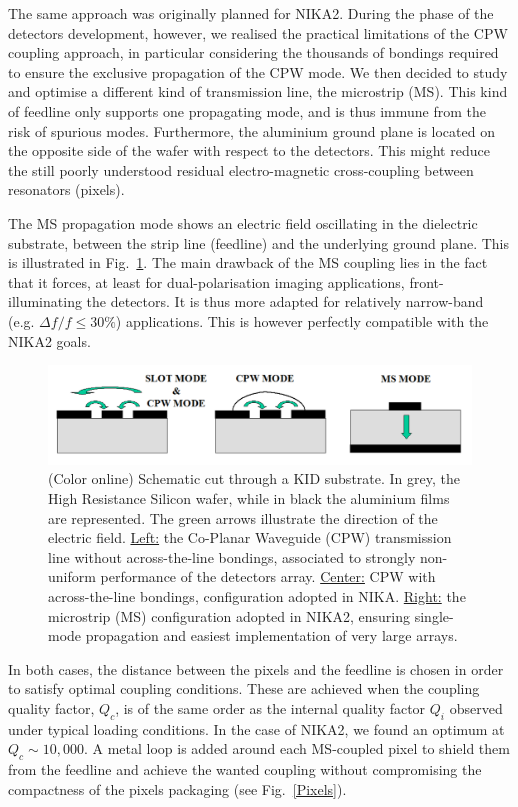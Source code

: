 \documentclass[]{aa} %
\begin{document}
The same approach was originally planned for NIKA2. During the phase of the detectors development, however, we realised the practical limitations of the CPW coupling approach, in particular considering the thousands of bondings required to ensure the exclusive propagation of the CPW mode. We then decided to study and optimise a different kind of transmission line, the microstrip (MS). This kind of feedline only supports one propagating mode, and is thus immune from the risk of spurious modes. Furthermore, the aluminium ground plane is located on the opposite side of the wafer with respect to the detectors. This might reduce the still poorly understood residual electro-magnetic cross-coupling between resonators (pixels).

The MS propagation mode shows an electric field oscillating in the dielectric substrate, between the strip line (feedline) and the underlying ground plane. This is illustrated in Fig.~\ref{CPWvsMS}. The main drawback of the MS coupling lies in the fact that it forces, at least for dual-polarisation imaging applications, front-illuminating the detectors. It is thus more adapted for relatively narrow-band (e.g. $\Delta f / f  \leq 30 \%$) applications. This is however perfectly compatible with the NIKA2 goals.  

\begin{figure}[h]
   \centering
    \includegraphics[width=.95\linewidth]{CPWvsMS.png}
      \caption{(Color online) Schematic cut through a KID substrate. In grey, the High Resistance Silicon wafer, while in black the aluminium films are represented. The green arrows illustrate the direction of the electric field. \underline{Left:} the Co-Planar Waveguide (CPW) transmission line without across-the-line bondings, associated to strongly non-uniform performance of the detectors array. \underline{Center:} CPW with across-the-line bondings, configuration adopted in NIKA. \underline{Right:} the microstrip (MS) configuration adopted in NIKA2, ensuring single-mode propagation and easiest implementation of very large arrays.}
         \label{CPWvsMS}
\end{figure}

In both cases, the distance between the pixels and the feedline is chosen in order to satisfy optimal coupling conditions. These are achieved when the coupling quality factor, $Q_c$, is of the same order as the internal quality factor $Q_i$ observed under typical loading conditions. In the case of NIKA2, we found an optimum at $Q_c\sim10,000$. A metal loop is added around each MS-coupled pixel to shield them from the feedline and achieve the wanted coupling without compromising the compactness of the pixels packaging (see Fig.~\ref{Pixels}). 
\end{document}
